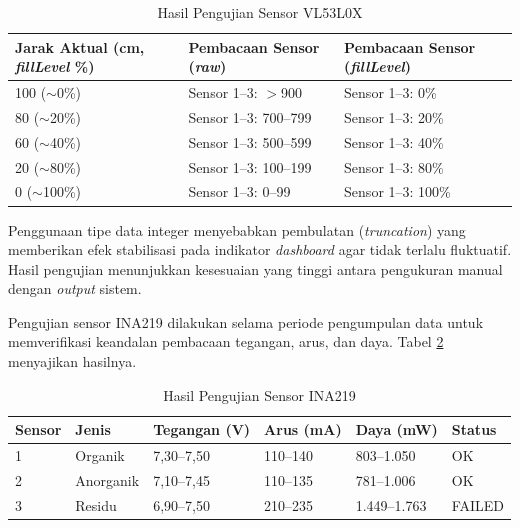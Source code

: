 \begin{table}[H]
  \caption{Hasil Pengujian Sensor VL53L0X}
  \label{tab:hasil-vlx}
  \begin{tabularx}{\textwidth}{| X | X | X |}
    \hline
    \textbf{Jarak Aktual (cm, \textit{fillLevel} \%)} & \textbf{Pembacaan Sensor (\textit{raw})} & \textbf{Pembacaan Sensor (\textit{fillLevel})} \\
    \hline
    100 ($\sim$0\%)  & Sensor 1--3: $>$900   & Sensor 1--3: 0\%   \\
    \hline
    80 ($\sim$20\%)  & Sensor 1--3: 700--799 & Sensor 1--3: 20\%  \\
    \hline
    60 ($\sim$40\%)  & Sensor 1--3: 500--599 & Sensor 1--3: 40\%  \\
    \hline
    20 ($\sim$80\%)  & Sensor 1--3: 100--199 & Sensor 1--3: 80\%  \\
    \hline
    0 ($\sim$100\%)  & Sensor 1--3: 0--99    & Sensor 1--3: 100\% \\
    \hline
  \end{tabularx}
\end{table}

Penggunaan tipe data integer menyebabkan pembulatan (\textit{truncation}) yang memberikan efek stabilisasi pada indikator \textit{dashboard} agar tidak terlalu fluktuatif. Hasil pengujian menunjukkan kesesuaian yang tinggi antara pengukuran manual dengan \textit{output} sistem.

Pengujian sensor INA219 dilakukan selama periode pengumpulan data untuk memverifikasi keandalan pembacaan tegangan, arus, dan daya. Tabel \ref{tab:hasil-ina219} menyajikan hasilnya.

\begin{table}[H]
  \caption{Hasil Pengujian Sensor INA219}
  \label{tab:hasil-ina219}
  \centering
  \begin{tabular}{| l | l | l | l | l | l |}
    \hline
    \textbf{Sensor} & \textbf{Jenis} & \textbf{Tegangan (V)} & \textbf{Arus (mA)} & \textbf{Daya (mW)} & \textbf{Status} \\
    \hline
    1 & Organik   & 7,30--7,50 & 110--140 & 803--1.050   & OK \\
    \hline
    2 & Anorganik & 7,10--7,45 & 110--135 & 781--1.006   & OK \\
    \hline
    3 & Residu    & 6,90--7,50 & 210--235 & 1.449--1.763 & FAILED \\
    \hline
  \end{tabular}
\end{table}

